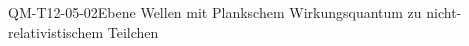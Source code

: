 
\begin{DEF}{QM-T12-05-02}{Ebene Wellen mit Plankschem Wirkungsquantum zu nicht-relativistischem Teilchen}
\end{DEF}
